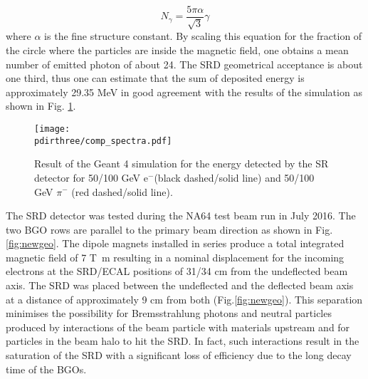 \begin{equation}
N_\gamma = \frac{5 \pi \alpha}{\sqrt{3}}\gamma
\end{equation}
where $\alpha$ is the fine structure constant. 
By scaling this equation for the fraction of the circle where the particles are inside the magnetic field, one obtains a mean number of emitted photon of about 24.
The SRD geometrical acceptance is about one third,  thus one can estimate that the sum of deposited energy is approximately 29.35 MeV in good agreement with the results of the simulation as shown in Fig. \ref{fig:SRspectrum}. 
 
\begin{figure}[htb!]
\centering
\texttt{[image: \\pdirthree/comp\_spectra.pdf]}
\caption[SR spectrum for different energy detected in the SRD]{Result of the Geant 4 simulation for the energy detected by the SR detector for 50/100 GeV e$^-$(black dashed/solid line) and 50/100 GeV $\pi^-$ (red dashed/solid line).}
\label{fig:SRspectrum}
\end{figure}

The SRD detector was tested during the NA64 test beam run in July 2016. The two BGO rows are parallel to the primary beam direction as shown in Fig.\ref{fig:newgeo}. The dipole magnets installed in series produce a total integrated magnetic field of 7 \si{\tesla\meter} \cite{Banerjee:2016tad} resulting in a nominal displacement for the incoming electrons at the SRD/ECAL positions of 31/34 cm from the undeflected beam axis. The SRD was placed between the undeflected and the deflected beam axis at a distance of approximately 9 cm from both (Fig.\ref{fig:newgeo}). This separation minimises the possibility for Bremsstrahlung photons and neutral particles produced by interactions of the beam particle with materials upstream and for particles in the beam halo to hit the SRD. In fact, such interactions result in the saturation of the SRD with a significant loss of efficiency due to the long decay time of the BGOs.


